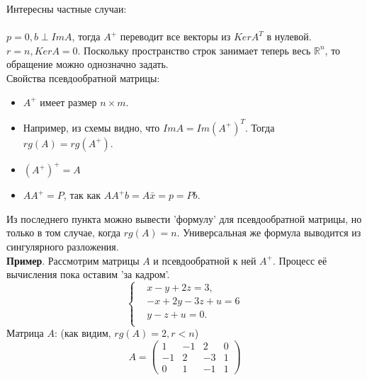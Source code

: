 \documentclass[a4paper,12pt]{article}
\begin{document}
Интересны частные случаи: \\
\\
$p = 0, b \perp Im A$, тогда $A^+$ переводит все векторы из $Ker A^T$ в нулевой. \\
$r = n, Ker A = {0}$. Поскольку пространство строк занимает теперь весь $\mathbb{R}^n$, то обращение можно однозначно задать. \\
Свойства псевдообратной матрицы:
\begin{itemize}
    \item $A^+$ имеет размер $n \times m$. 
    \item Например, из схемы видно, что $Im A = Im (A^+)^T$. Тогда $rg(A) = rg(A^+)$.
    \item $(A^+)^+ = A$
    \item $AA^+ = P$, так как $AA^+b = A\bar{x} = p = Pb$. 
\end{itemize}
Из последнего пункта можно вывести 'формулу' для псевдообратной матрицы, но только в том случае, когда $rg(A) = n$. Универсальная же формула выводится из сингулярного разложения. \\
\textbf{Пример}. Рассмотрим матрицы $A$ и псевдообратной к ней $A^+$. Процесс её вычисления пока оставим 'за кадром'.
\begin{equation*}
 \begin{cases}
&x- y + 2z =3,\\
&-x +2 y -3 z+u=6\\
&y-z+u=0 .\\
 \end{cases}
\end{equation*}
Матрица $A$: (как видим, $rg(A) = 2, r < n$)
\[ A = \begin{pmatrix} 
1 & -1 & 2 & 0 \\
-1 & 2 & -3 & 1 \\
0 & 1 & -1 & 1
\end{pmatrix} \]
\end{document}
